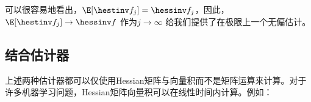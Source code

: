 可以很容易地看出，$\E[\hestinv f_j] = \hessinv f_j$，因此，$\E[\hestinv f_j] \rightarrow \hessinv f$ 作为$j \rightarrow \infty$ 给我们提供了在极限上一个无偏估计。



\subsection{
    结合估计器
    } 

上述两种估计器都可以仅使用Hessian矩阵与向量积而不是矩阵运算来计算。对于许多机器学习问题，Hessian矩阵向量积可以在线性时间内计算。例如：
